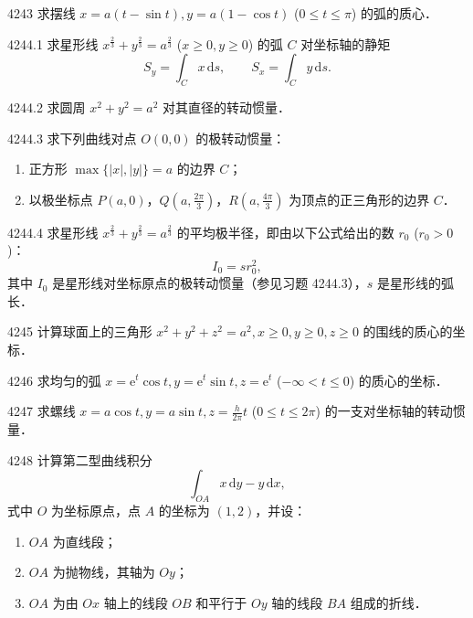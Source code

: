 \begin{prob}[M]{4243}
求摆线 $x = a(t-\sin t), y = a(1-\cos t)$ ($0 \leqslant t \leqslant \pi$) 的弧的质心．
\end{prob}

\begin{prob}[M]{4244.1}
求星形线 $x^{\frac{2}{3}} + y^{\frac{2}{3}} = a^{\frac{2}{3}}$ ($x \geqslant 0, y \geqslant 0$) 的弧 $C$ 对坐标轴的静矩
\[
S_y = \int_C x\,\mathrm{d}s, \qquad S_x = \int_C y\,\mathrm{d}s.
\]
\end{prob}

\begin{prob}[M]{4244.2}
求圆周 $x^2+y^2 = a^2$ 对其直径的转动惯量．
\end{prob}

\begin{prob}[M]{4244.3}
求下列曲线对点 $O(0,0)$ 的极转动惯量：
\begin{enumerate}[label=(\alph*), itemsep=2pt, topsep=3pt]
\item 正方形 $\max\{|x|, |y|\} = a$ 的边界 $C$；
\item 以极坐标点 $P(a,0)$，$Q\left(a, \frac{2\pi}{3}\right)$，$R\left(a, \frac{4\pi}{3}\right)$ 为顶点的正三角形的边界 $C$．
\end{enumerate}
\end{prob}

\begin{prob}[M]{4244.4}
求星形线 $x^{\frac{2}{3}} + y^{\frac{2}{3}} = a^{\frac{2}{3}}$ 的平均极半径，即由以下公式给出的数 $r_0$ ($r_0 > 0$)：
\[
I_0 = sr_0^2,
\]
其中 $I_0$ 是星形线对坐标原点的极转动惯量（参见习题 4244.3），$s$ 是星形线的弧长．
\end{prob}

\begin{prob}[M]{4245}
计算球面上的三角形 $x^2+y^2+z^2 = a^2, x \geqslant 0, y \geqslant 0, z \geqslant 0$ 的围线的质心的坐标．
\end{prob}

\begin{prob}[M]{4246}
求均匀的弧 $x = \mathrm{e}^t\cos t, y = \mathrm{e}^t\sin t, z = \mathrm{e}^t$ ($-\infty < t \leqslant 0$) 的质心的坐标．
\end{prob}

\begin{prob}[M]{4247}
求螺线 $x = a\cos t, y = a\sin t, z = \frac{h}{2\pi}t$ ($0 \leqslant t \leqslant 2\pi$) 的一支对坐标轴的转动惯量．
\end{prob}

\begin{prob}[L]{4248}
计算第二型曲线积分
\[
\int_{OA} x\,\mathrm{d}y - y\,\mathrm{d}x,
\]
式中 $O$ 为坐标原点，点 $A$ 的坐标为 $(1,2)$，并设：
\begin{enumerate}[label=(\alph*), itemsep=2pt, topsep=3pt]
\item $OA$ 为直线段；
\item $OA$ 为抛物线，其轴为 $Oy$；
\item $OA$ 为由 $Ox$ 轴上的线段 $OB$ 和平行于 $Oy$ 轴的线段 $BA$ 组成的折线．
\end{enumerate}
\end{prob}

